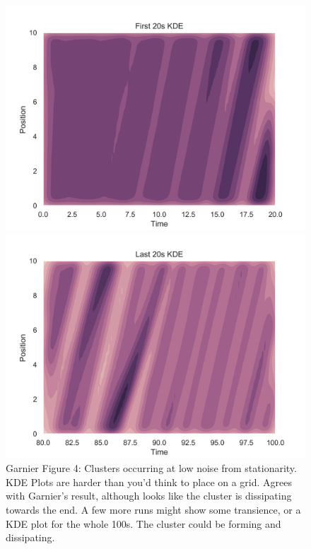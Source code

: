 \documentclass[11pt,a4paper, final, dvipsnames]{article}
\begin{document}
\begin{figure}
    \begin{minipage}[b]{0.49\textwidth}
        \centering
        \includegraphics[width=\textwidth]{GarnierFigure4b}
    \end{minipage} %
    \begin{minipage}[b]{0.49\textwidth}
        \centering                    \includegraphics[width=\textwidth]{GarnierFigure4d}
    \end{minipage}
    \caption{Garnier Figure 4: Clusters occurring at low noise from stationarity. KDE Plots are harder than you'd think to place on a grid. Agrees with Garnier's result, although looks like the cluster is dissipating towards the end. A few more runs might show some transience, or a KDE plot for the whole 100s. The cluster could be forming and dissipating.}
\end{figure}
\end{document}
